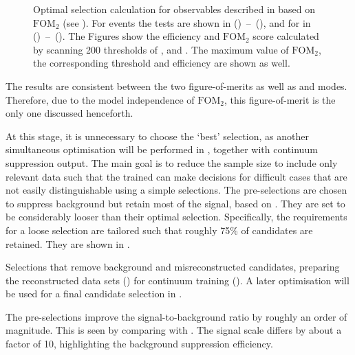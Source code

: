 \begin{figure}[hbtp!]
{        }
    \caption{\label{fig:selection_optimisations} Optimal selection calculation for observables
    described in  based on $\mathrm{FOM}_2$ (see ).
    For \BptoXsgamma events the tests are shown
    in \mbox{() -- ()},
    and for \BztoXsgamma in \mbox{() -- ()}.
    The Figures show the efficiency and $\mathrm{FOM}_2$ score calculated by scanning 200 thresholds of \piVeto, \etaVeto and \ZMVA.
    The maximum value of $\mathrm{FOM}_2$, the corresponding threshold and efficiency are shown as well.
    }
\end{figure}
The results are consistent between the two figure-of-merits as well as \Bp and \Bz modes.
Therefore, due to the model independence of $\mathrm{FOM}_2$, this figure-of-merit is the only one discussed henceforth.

At this stage, it is unnecessary to choose the `best' selection, 
as another simultaneous optimisation will be performed  in , together with continuum suppression \BDT output.
The main goal is to reduce the sample size to include only relevant data 
such that the trained \BDT can make decisions for difficult cases that are not easily distinguishable using a simple selections.
The pre-selections are chosen to suppress background but retain most of the signal, based on .
They are set to be considerably looser than their optimal selection.
Specifically, the requirements for a loose selection are tailored such that roughly 75\% of \BtoXsgamma candidates are retained.
They are shown in .

\begin{table}[hbtp!]
    \centering
    \caption{\label{tab:preselections} Selections that remove background and misreconstructed candidates,
    preparing the reconstructed data sets () for continuum \BDT training ().
    A later optimisation will be used for a final candidate selection in .
    }
    
\end{table}

The pre-selections improve the signal-to-background ratio by roughly an order of magnitude.
This is seen by comparing  with .
The \BtoXsgamma signal \MC scale differs by about a factor of 10, highlighting the background suppression efficiency.


